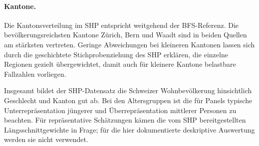 \paragraph{Kantone.}
Die Kantonsverteilung im SHP entspricht weitgehend der BFS-Referenz. Die
bevölkerungsreichsten Kantone Zürich, Bern und Waadt sind in beiden Quellen am
stärksten vertreten. Geringe Abweichungen bei kleineren Kantonen lassen sich durch die
geschichtete Stichprobenziehung des SHP erklären, die einzelne Regionen gezielt
übergewichtet, damit auch für kleinere Kantone belastbare Fallzahlen vorliegen.

Insgesamt bildet der SHP-Datensatz die Schweizer Wohnbevölkerung hinsichtlich
Geschlecht und Kanton gut ab. Bei den Altersgruppen ist die für Panels typische
Unterrepräsentation jüngerer und Überrepräsentation mittlerer Personen zu beachten.
Für repräsentative Schätzungen kämen die vom SHP bereitgestellten
Längsschnittgewichte in Frage; für die hier dokumentierte deskriptive Auswertung
werden sie nicht verwendet.
